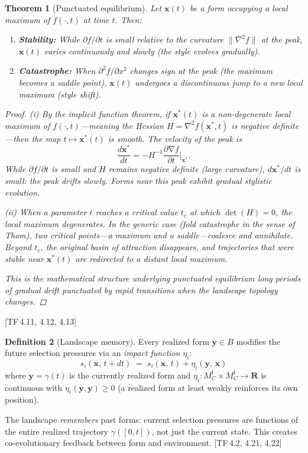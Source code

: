 \documentclass[10pt]{article}
\theoremstyle{definition}
\newtheorem{definition}{Definition}[section]
\theoremstyle{plain}
\newtheorem{theorem}[definition]{Theorem}
\theoremstyle{remark}
\newcommand{\MC}{M^{\mathsf{I}}_C}          %
\providecommand{\R}{}
\renewcommand{\R}{\mathbf{R}}               %
\newcommand{\norm}[1]{\lVert #1 \rVert}
\DeclareMathOperator{\grad}{\nabla}
\newcommand{\TF}[1]{\textnormal{[TF\,#1]}}  %
\begin{document}
\begin{theorem}[Punctuated equilibrium]\label{thm:4.2}
Let $\bm{x}(t)$ be a form occupying a local maximum of $f(\cdot, t)$
at time $t$. Then:
\begin{enumerate}[label=(\roman*),nosep]
  \item \textbf{Stability:} While $\partial f / \partial t$ is small
    relative to the curvature $\norm{\nabla^2 f}$ at the peak,
    $\bm{x}(t)$ varies continuously and slowly (the style evolves
    gradually).
  \item \textbf{Catastrophe:} When $\partial^2 f / \partial x^2$ changes
    sign at the peak (the maximum becomes a saddle point), $\bm{x}(t)$
    undergoes a discontinuous jump to a new local maximum (style shift).
\end{enumerate}

\begin{proof}
\textit{(i)}\; By the implicit function theorem, if $\bm{x}^*(t)$ is a
non-degenerate local maximum of $f(\cdot, t)$---meaning the Hessian
$H = \nabla^2 f(\bm{x}^*, t)$ is negative definite---then the map
$t \mapsto \bm{x}^*(t)$ is smooth. The velocity of the peak is
\[
  \frac{d\bm{x}^*}{dt} = -H^{-1} \frac{\partial \grad f}{\partial t}
  \bigg|_{\bm{x}^*}.
\]
While $\partial f / \partial t$ is small and $H$ remains negative
definite (large curvature), $d\bm{x}^*/dt$ is small: the peak drifts
slowly. Forms near this peak exhibit gradual stylistic evolution.

\textit{(ii)}\; When a parameter $t$ reaches a critical value $t_c$ at
which $\det(H) = 0$, the local maximum degenerates. In the generic case
(fold catastrophe in the sense of Thom), two critical points---a maximum
and a saddle---coalesce and annihilate. Beyond $t_c$, the original basin
of attraction disappears, and trajectories that were stable near
$\bm{x}^*(t)$ are redirected to a distant local maximum.

This is the mathematical structure underlying punctuated equilibrium
long periods of gradual drift punctuated
by rapid transitions when the landscape topology changes. \qedhere
\end{proof}
\end{theorem}

\TF{4.11, 4.12, 4.13}

\begin{definition}[Landscape memory]\label{def:4.3}
Every realized form $\bm{y} \in B$ modifies the future selection
pressures via an \emph{impact function} $\eta_i$:
\[
  s_i(\bm{x},\, t + dt) \;=\;
  s_i(\bm{x},\, t) + \eta_i(\bm{y},\, \bm{x})
\]
where $\bm{y} = \gamma(t)$ is the currently realized form and
$\eta_i : \MC \times \MC \to \R$ is continuous with
$\eta_i(\bm{y}, \bm{y}) \geq 0$ (a realized form at least weakly
reinforces its own position).

The landscape \emph{remembers} past forms: current selection pressures
are functions of the entire realized trajectory $\gamma([0, t])$,
not just the current state. This creates co-evolutionary feedback
between form and environment. \TF{4.2, 4.21, 4.22}
\end{definition}
\end{document}
